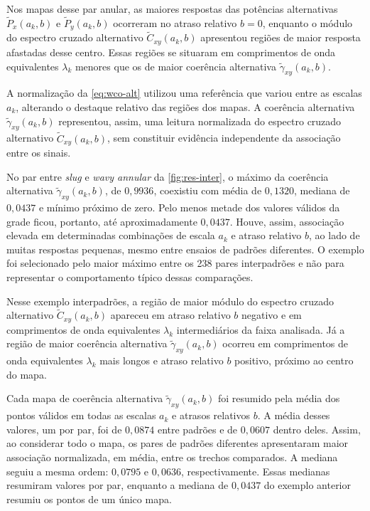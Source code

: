 Nos mapas desse par anular, as maiores respostas das potências alternativas
$\widetilde P_x(a_k,b)$ e $\widetilde P_y(a_k,b)$ ocorreram no atraso
relativo $b=0$, enquanto o módulo do espectro cruzado alternativo
$\widetilde C_{xy}(a_k,b)$ apresentou regiões de maior resposta afastadas
desse centro. Essas regiões se situaram em comprimentos de onda equivalentes
$\lambda_k$ menores que os de maior coerência alternativa
$\widetilde\gamma_{xy}(a_k,b)$.

A normalização da \autoref{eq:wco-alt} utilizou uma referência que variou
entre as escalas $a_k$, alterando o destaque relativo das regiões dos
mapas. A coerência alternativa $\widetilde\gamma_{xy}(a_k,b)$ representou,
assim, uma leitura normalizada do espectro cruzado alternativo
$\widetilde C_{xy}(a_k,b)$, sem constituir evidência independente da
associação entre os sinais.

No par entre \textit{slug} e \textit{wavy annular} da \autoref{fig:res-inter},
o máximo da coerência alternativa $\widetilde\gamma_{xy}(a_k,b)$, de
$0{,}9936$, coexistiu com média de $0{,}1320$, mediana de $0{,}0437$ e
mínimo próximo de zero. Pelo menos metade dos valores válidos da grade
ficou, portanto, até aproximadamente $0{,}0437$. Houve, assim, associação
elevada em determinadas combinações de escala $a_k$ e atraso relativo $b$,
ao lado de muitas respostas pequenas, mesmo entre ensaios de padrões
diferentes.
O exemplo foi selecionado pelo maior máximo entre os 238 pares interpadrões
e não para representar o comportamento típico dessas comparações.

Nesse exemplo interpadrões, a região de maior módulo do espectro cruzado
alternativo $\widetilde C_{xy}(a_k,b)$ apareceu em atraso relativo $b$
negativo e em comprimentos de onda equivalentes $\lambda_k$ intermediários
da faixa analisada. Já a região de maior coerência alternativa
$\widetilde\gamma_{xy}(a_k,b)$ ocorreu em comprimentos de onda equivalentes
$\lambda_k$ mais longos e atraso relativo $b$ positivo, próximo ao centro
do mapa.

Cada mapa de coerência alternativa $\widetilde\gamma_{xy}(a_k,b)$ foi
resumido pela média dos pontos válidos em todas as escalas $a_k$ e atrasos
relativos $b$. A média desses valores, um por par, foi de $0{,}0874$ entre
padrões e de $0{,}0607$ dentro deles. Assim, ao considerar todo o mapa,
os pares de padrões diferentes apresentaram maior associação normalizada,
em média, entre os trechos comparados. A mediana seguiu a mesma ordem:
$0{,}0795$ e $0{,}0636$, respectivamente. Essas medianas resumiram valores
por par, enquanto a mediana de $0{,}0437$ do exemplo anterior resumiu os
pontos de um único mapa.

